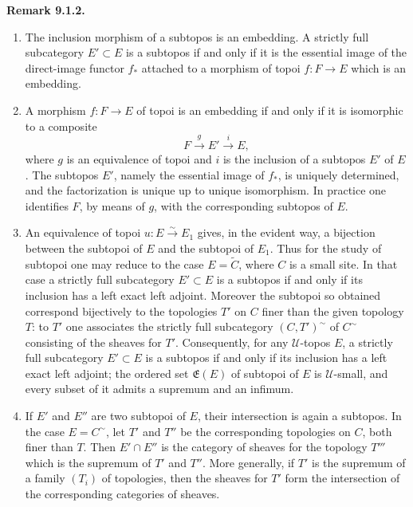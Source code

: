 \documentclass[11pt]{article}
\newcommand{\U}{\mathcal{U}}
\newenvironment{remarktext}[1]{\par\medskip\noindent\textbf{#1.}\ }{\par\medskip}
\begin{document}
\begin{remarktext}{Remark 9.1.2}
\begin{enumerate}[label=\alph*)]
\item The inclusion morphism of a subtopos is an embedding. A strictly full subcategory \(E'\subset E\) is a subtopos if and only if it is the essential image of the direct-image functor \(f_*\) attached to a morphism of topoi \(f:F\to E\) which is an embedding.

\item A morphism \(f:F\to E\) of topoi is an embedding if and only if it is isomorphic to a composite
\[
F\xrightarrow{g} E'\xrightarrow{i} E,
\]
where \(g\) is an equivalence of topoi and \(i\) is the inclusion of a subtopos \(E'\) of \(E\). The subtopos \(E'\), namely the essential image of \(f_*\), is uniquely determined, and the factorization is unique up to unique isomorphism. In practice one identifies \(F\), by means of \(g\), with the corresponding subtopos of \(E\).

\item An equivalence of topoi \(u:E\xrightarrow{\sim}E_1\) gives, in the evident way, a bijection between the subtopoi of \(E\) and the subtopoi of \(E_1\). Thus for the study of subtopoi one may reduce to the case \(E=\widetilde C\), where \(C\) is a small site. In that case a strictly full subcategory \(E'\subset E\) is a subtopos if and only if its inclusion has a left exact left adjoint. Moreover the subtopoi so obtained correspond bijectively to the topologies \(T'\) on \(C\) finer than the given topology \(T\): to \(T'\) one associates the strictly full subcategory \((C,T')^\sim\) of \(C^\sim\) consisting of the sheaves for \(T'\). Consequently, for any \(\U\)-topos \(E\), a strictly full subcategory \(E'\subset E\) is a subtopos if and only if its inclusion has a left exact left adjoint; the ordered set \(\mathfrak E(E)\) of subtopoi of \(E\) is \(\U\)-small, and every subset of it admits a supremum and an infimum.

\item If \(E'\) and \(E''\) are two subtopoi of \(E\), their intersection is again a subtopos. In the case \(E=C^\sim\), let \(T'\) and \(T''\) be the corresponding topologies on \(C\), both finer than \(T\). Then \(E'\cap E''\) is the category of sheaves for the topology \(T'''\) which is the supremum of \(T'\) and \(T''\). More generally, if \(T'\) is the supremum of a family \((T_i)\) of topologies, then the sheaves for \(T'\) form the intersection of the corresponding categories of sheaves.
\end{enumerate}
\end{remarktext}
\end{document}
